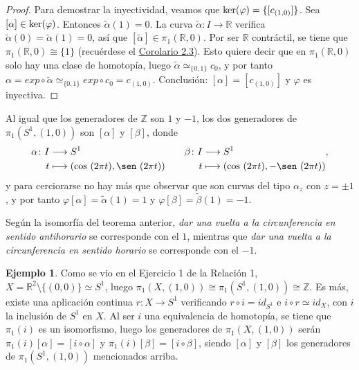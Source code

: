 \documentclass[11pt]{report}
\theoremstyle{definition}
\theoremstyle{definition}
\newtheorem{example}{Ejemplo}[chapter]
\theoremstyle{remark}
\newcommand{\R}{\mathbb R}
\newcommand{\Z}{\mathbb Z}
\begin{document}
\begin{proof}
\vspace{2mm}

Para demostrar la inyectividad, veamos que $\textup{ker}(\varphi) = \{[c_{(1,0)}]\}$. Sea $[\alpha] \in \textup{ker}(\varphi)$. Entonces $\tilde{\alpha}(1) = 0$. La curva $\tilde{\alpha} \colon I \to \R$ verifica $\tilde{\alpha}(0) = \tilde{\alpha}(1) =0$, así que $[\tilde{\alpha}] \in \pi_1(\R,0)$. Por ser $\R$ contráctil, se tiene que $\pi_1(\R,0) \cong \{1\}$ (recuérdese el \hyperref[cor2.3.]{\color{blue}Corolario 2.3}). Esto quiere decir que en $\pi_1(\R,0)$ solo hay una clase de homotopía, luego $\tilde{\alpha} \simeq_{\{0,1\}}c_0$, y por tanto $\alpha = exp \circ \tilde{\alpha} \simeq_{\{0,1\}} exp \circ c_0 = c_{(1,0)}$. Conclusión: $[\alpha] = [c_{(1,0)}]$ y $\varphi$ es inyectiva.
\end{proof}

Al igual que los generadores de $\Z$ son $1$ y $-1$, los dos generadores de $\pi_1(S^1,(1,0))$ son $[\alpha]$ y $[\beta]$, donde
\[\begin{aligned}[t]
    \alpha \colon I &\longrightarrow S^1 \\
    t &\longmapsto (\cos \ (2\pi t), \sen \ (2\pi t))
\end{aligned} \qquad \begin{aligned}[t]
    \beta \colon I &\longrightarrow S^1 \\
    t &\longmapsto (\cos \ (2\pi t), -\sen \ (2\pi t))
\end{aligned},\]
y para cerciorarse no hay más que observar que son curvas del tipo $\alpha_z$ con $z = \pm 1$, y por tanto $\varphi[\alpha] = \tilde{\alpha}(1) = 1$ y $\varphi[\beta] = \tilde{\beta}(1) = -1$.

\vspace{2mm}

Según la isomorfía del teorema anterior, \textit{dar una vuelta a la circunferencia en sentido antihorario} se corresponde con el $1$, mientras que \textit{dar una vuelta a la circunferencia en sentido horario} se corresponde con el $-1$.

\begin{example}
Como se vio en el Ejercicio 1 de la Relación 1, $X= \R^2 \setminus \{(0,0)\} \simeq S^1$, luego $\pi_1(X,(1,0)) \cong \pi_1(S^1,(1,0)) \cong \Z$. Es más, existe una aplicación continua $r \colon X \to S^1$ verificando $r \circ i = id_{S^1}$ e $i \circ r \simeq id_X$, con $i$ la inclusión de $S^1$ en $X$. Al ser $i$ una equivalencia de homotopía, se tiene que $\pi_1(i)$ es un isomorfismo, luego los generadores de $\pi_1(X,(1,0))$ serán $\pi_1(i)[\alpha] = [i \circ \alpha]$ y $\pi_1(i)[\beta] = [i \circ \beta]$, siendo $[\alpha]$ y $[\beta]$ los generadores de $\pi_1(S^1,(1,0))$ mencionados arriba.
\end{example}
\end{document}
